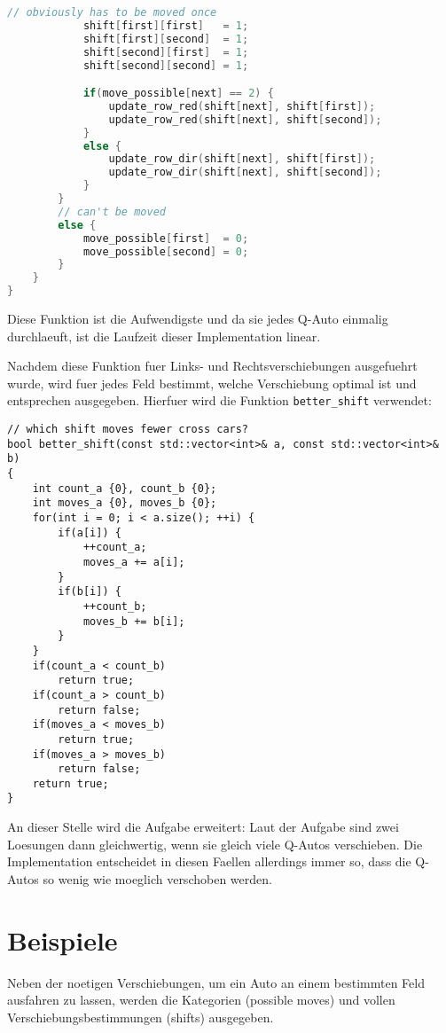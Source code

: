 \documentclass[a4paper,10pt,ngerman]{scrartcl}
\begin{document}
\begin{lstlisting}[language=C++]
            // obviously has to be moved once
            shift[first][first]   = 1;
            shift[first][second]  = 1;
            shift[second][first]  = 1;
            shift[second][second] = 1;

            if(move_possible[next] == 2) {
                update_row_red(shift[next], shift[first]);
                update_row_red(shift[next], shift[second]);
            }
            else {
                update_row_dir(shift[next], shift[first]);
                update_row_dir(shift[next], shift[second]);
            }
        }
        // can't be moved
        else {
            move_possible[first]  = 0;
            move_possible[second] = 0;
        }
    }
}
\end{lstlisting}
Diese Funktion ist die Aufwendigste und da sie jedes Q-Auto einmalig durchlaeuft, ist die Laufzeit dieser Implementation linear.

Nachdem diese Funktion fuer Links- und Rechtsverschiebungen ausgefuehrt wurde, wird fuer jedes Feld bestimmt, welche Verschiebung optimal ist und entsprechen ausgegeben.
Hierfuer wird die Funktion \lstinline{better_shift} verwendet:
\begin{lstlisting}
// which shift moves fewer cross cars?
bool better_shift(const std::vector<int>& a, const std::vector<int>& b)
{
    int count_a {0}, count_b {0};
    int moves_a {0}, moves_b {0};
    for(int i = 0; i < a.size(); ++i) {
        if(a[i]) {
            ++count_a;
            moves_a += a[i];
        }
        if(b[i]) {
            ++count_b;
            moves_b += b[i];
        }
    }
    if(count_a < count_b)
        return true;
    if(count_a > count_b)
        return false;
    if(moves_a < moves_b)
        return true;
    if(moves_a > moves_b)
        return false;
    return true;
}
\end{lstlisting}
An dieser Stelle wird die Aufgabe erweitert:
Laut der Aufgabe sind zwei Loesungen dann gleichwertig, wenn sie gleich viele Q-Autos verschieben.
Die Implementation entscheidet in diesen Faellen allerdings immer so, dass die Q-Autos so wenig wie moeglich verschoben werden.

\section{Beispiele}
Neben der noetigen Verschiebungen, um ein Auto an einem bestimmten Feld ausfahren zu lassen, werden die Kategorien (possible moves) und vollen Verschiebungsbestimmungen (shifts) ausgegeben.
\end{document}

